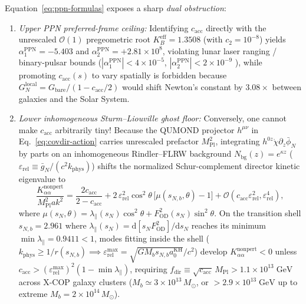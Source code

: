 \documentclass[11pt,a4paper]{article}
\begin{document}
Equation~\eqref{eq:ppn-formulas} exposes a sharp \emph{dual obstruction}:
\begin{enumerate}[label=(\alph*),leftmargin=2.0em,itemsep=2pt]
\item \emph{Upper PPN preferred-frame ceiling:} Identifying $c_{\mathrm{acc}}$ directly with the unrescaled $\mathcal{O}(1)$ pregeometric root $K_B^{\mathrm{eff}} = 1.3508$ (with $c_2 = 10^{-8}$) yields $\alpha_1^{\mathrm{PPN}} = -5.403$ and $\alpha_2^{\mathrm{PPN}} = +2.81\times 10^8$, violating lunar laser ranging / binary-pulsar bounds ($|\alpha_1^{\mathrm{PPN}}| < 4\times 10^{-5}$, $|\alpha_2^{\mathrm{PPN}}| < 2\times 10^{-9}$ \cite{Will2014,OostMukohyamaWang2018}), while promoting $c_{\mathrm{acc}}(s)$ to vary spatially is forbidden because $G_N^{\mathrm{local}} = G_{\mathrm{bare}}/(1 - c_{\mathrm{acc}}/2)$ would shift Newton's constant by $3.08\times$ between galaxies and the Solar System.
\item \emph{Lower inhomogeneous Sturm--Liouville ghost floor:} Conversely, one cannot make $c_{\mathrm{acc}}$ arbitrarily tiny! Because the QUMOND projector $h^{\mu\nu}$ in Eq.~\eqref{eq:covdir-action} carries unrescaled prefactor $M_{\mathrm{Pl}}^2$, integrating $h^{0z}\dot{\chi}\partial_z\bar{\phi}_N$ by parts on an inhomogeneous Rindler--FLRW background $N_{\mathrm{bg}}(z) = e^{\kappa z}$ ($\varepsilon_{\mathrm{rel}} \equiv \bar{g}_N/(c^2 k_{\mathrm{phys}})$) shifts the normalized Schur-complement director kinetic eigenvalue to
\begin{equation}
\frac{K_{\alpha\alpha}^{\mathrm{nonpert}}}{M_{\mathrm{Pl}}^2 a k^2}
= \frac{2 c_{\mathrm{acc}}}{2 - c_{\mathrm{acc}}} + 2\,\varepsilon_{\mathrm{rel}}^2\cos^2\theta\,\bigl[\mu(s_{N,b},\theta) - 1\bigr] + \mathcal{O}(c_{\mathrm{acc}}\varepsilon_{\mathrm{rel}}^2, \varepsilon_{\mathrm{rel}}^4),
\label{eq:sl-eigenvalue}
\end{equation}
where $\mu(s_N,\theta) = \lambda_\parallel(s_N)\cos^2\theta + F_{\mathrm{OD}}^2(s_N)\sin^2\theta$. On the transition shell $s_{N,b} = 2.961$ where $\lambda_\parallel(s_N) = \mathrm{d}[s_N F_{\mathrm{OD}}^2]/\mathrm{d}s_N$ reaches its minimum $\min\lambda_\parallel = 0.9411 < 1$, modes fitting inside the shell ($k_{\mathrm{phys}} \ge 1/r(s_{N,b}) \implies \varepsilon_{\mathrm{rel}}^{\max} = \sqrt{G M_b s_{N,b} a_0^{\mathrm{KH}}}/c^2$) develop $K_{\alpha\alpha}^{\mathrm{nonpert}} < 0$ unless $c_{\mathrm{acc}} > (\varepsilon_{\mathrm{rel}}^{\max})^2(1 - \min\lambda_\parallel)$, requiring $f_{\mathrm{dir}} \equiv \sqrt{c_{\mathrm{acc}}}\,M_{\mathrm{Pl}} > 1.1\times 10^{13}\;\mathrm{GeV}$ across X-COP galaxy clusters ($M_b \simeq 3\times 10^{13}\,M_\odot$, or $> 2.9\times 10^{13}\;\mathrm{GeV}$ up to extreme $M_b = 2\times 10^{14}\,M_\odot$).
\end{enumerate}
\end{document}
